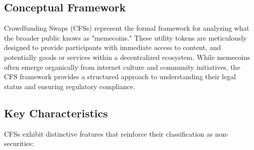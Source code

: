 \documentclass[a4paper,12pt]{article}
\begin{document}
\subsection{Conceptual Framework}
Crowdfunding Swaps (CFSs) represent the formal framework for analyzing what the broader public knows as "memecoins." These utility tokens are meticulously designed to provide participants with immediate access to content, and potentially goods or services within a decentralized ecosystem. While memecoins often emerge organically from internet culture and community initiatives, the CFS framework provides a structured approach to understanding their legal status and ensuring regulatory compliance.

\subsection{Key Characteristics}
CFSs exhibit distinctive features that reinforce their classification as non-securities:
\end{document}
